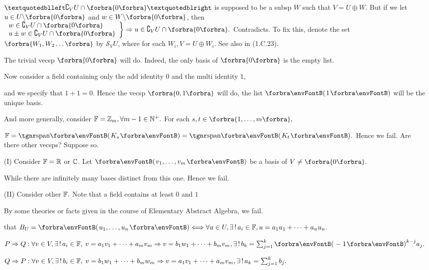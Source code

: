 \documentclass[a4paper, 11pt, UTF8]{article}
\begin{document}
\begin{large}
\BulletPointX{}\TextB{}
$“\complement_V U \cap \zeroSubs”$ is supposed to be a subsp $W$ such that $V=U\oplus W$.\TextB{}
But if we let $u\in U\backslash\zeroSubs$ and $w\in W\backslash\zeroSubs$, then $\MathRightBrace{l}{w\in\complement_V U \cap \zeroSubs\\ u\pm w\in\complement_V U \cap \zeroSubs }\Rightarrow u\in\complement_V U \cap \zeroSubs.$ Contradicts.\vspace{4pt}\TextB{}
To fix this, {\Large\envFontLarge denote the set $\Bra{W_1,W_2\dots}$ by $\mathcal{S}_V U$,} {\small where for each $W_i,V=U\oplus W_i$. See also in (1.C.23).}\par\SepLine

The trivial vecsp $\zeroSubs$ will do. Indeed, the only basis of $\zeroSubs$ is the empty list.\par\quad
Now consider a field containing only the add identity $0$ and the multi identity $1$,\par\quad
and we specify that $1+1=0.$ Hence the vecsp $\Bra{0,1}$ will do, the list $\Par{1}$ will be the unique basis.\par\quad
And more generally, consider ${\mathbb{F}}={\mathbb{Z}}_m,\forall m-1\in{\mathbb{N}^+}.$ For each $s,t\in\Bra{1,\dots,m},$\par\quad
$\Fbb=\Span{K_s}=\Span{K_t}.$ Hence we fail.
Are there other vecsps? Suppose so.\par\quad
(I) Consider ${\mathbb{F}}={\mathbb{R}}$ or ${\mathbb{C}}$. Let $\Par{v_1,\dots,v_m}$ be a basis of $V\neq\zeroSubs$.\par\quad\HI
While there are infinitely many bases distinct from this one. Hence we fail.\par\quad\EndI
(II) Consider other ${\mathbb{F}}.$ Note that a field contains at least $0$ and $1$\par\quad\HII
By {\tgsc some theories or facts} given in the course of Elementary Abstract Algebra, we fail.\PfEnd
\SepLine

\NOTICE that $B_U=\Par{u_1,\dots,u_n}\Longleftrightarrow\forall u\in U,\exists\,!\,a_i\in\Fbb,u=a_1 u_1+\dots+a_n u_n.$\par\quad
$P\Rightarrow Q:\forall v\in V,\exists\,!\,a_i\in\Fbb,\;v=a_1 v_1+\dots+a_m v_m\Rightarrow v=b_1 w_1+\dots+b_m v_m,\exists\,!\,b_k=\sum_{j=1}^k\Par{-1}^{k-j}a_j.$\par\quad
$Q\Rightarrow P:\forall v\in V,\exists\,!\,b_i\in{\mathbb{F}},\;v=b_1w_1+\dots+b_mw_m\Rightarrow v=a_1v_1+\dots+a_mv_m,\exists\,!\,a_k=\sum_{j=1}^k b_j.$\PfEnd
\SepLine


\end{large}
\end{document}

